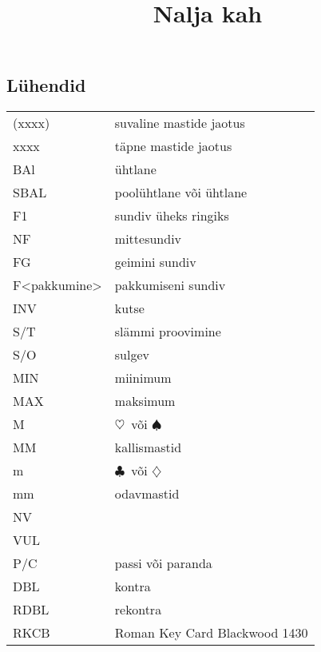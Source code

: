 \documentclass[10pt]{article}
\title{Nalja kah\vspace{-1em}}
\renewcommand{\c}{$\clubsuit$}
\renewcommand{\d}{$\diamondsuit$}
\newcommand{\h}{$\heartsuit$}
\newcommand{\s}{$\spadesuit$}
\begin{document}
\begin{multicols*}{2}
\maketitle
\tableofcontents

\section{Lühendid}
\begin{tabular}{l l}
  (xxxx)       & suvaline mastide jaotus       \\
  xxxx         & täpne mastide jaotus          \\
  BAl          & ühtlane                       \\
  SBAL         & poolühtlane või ühtlane       \\
  F1           & sundiv üheks ringiks          \\
  NF           & mittesundiv                   \\
  FG           & geimini sundiv                \\
  F<pakkumine> & pakkumiseni sundiv            \\
  INV          & kutse                         \\
  S/T          & slämmi proovimine             \\
  S/O          & sulgev                        \\
  MIN          & miinimum                      \\
  MAX          & maksimum                      \\
  M            & \h\ või \s\                   \\
  MM           & kallismastid                  \\
  m            & \c\ või \d\                   \\
  mm           & odavmastid                    \\
  NV           &                               \\
  VUL          &                               \\
  P/C          & passi või paranda             \\
  DBL          & kontra                        \\
  RDBL         & rekontra                      \\
  RKCB         & Roman Key Card Blackwood 1430
\end{tabular}



\end{multicols*}
\end{document}
